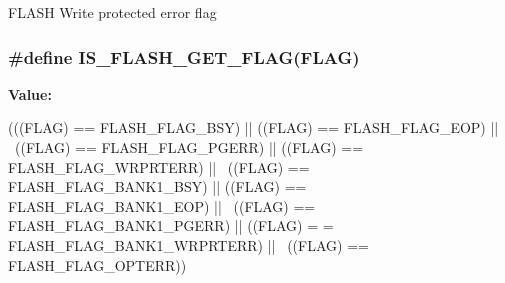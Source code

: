 \label{group__FLASH__Flags_ga5c59a7f07507cac38091275964d3d35d}
FLASH Write protected error flag \hypertarget{group__FLASH__Flags_ga61b60325cd94e1608e34afc7aff20ee4}{
\subsubsection[{IS\_\-FLASH\_\-GET\_\-FLAG}]{\setlength{\rightskip}{0pt plus 5cm}\#define IS\_\-FLASH\_\-GET\_\-FLAG(FLAG)}}
\label{group__FLASH__Flags_ga61b60325cd94e1608e34afc7aff20ee4}
{\bfseries Value:}
\begin{DoxyCode}
(((FLAG) == FLASH_FLAG_BSY) || ((FLAG) == FLASH_FLAG_EOP) || \
                                  ((FLAG) == FLASH_FLAG_PGERR) || ((FLAG) == 
      FLASH_FLAG_WRPRTERR) || \
                                                                  ((FLAG) == 
      FLASH_FLAG_BANK1_BSY) || ((FLAG) == FLASH_FLAG_BANK1_EOP) || \
                                  ((FLAG) == FLASH_FLAG_BANK1_PGERR) || ((FLAG) =
      = FLASH_FLAG_BANK1_WRPRTERR) || \
                                  ((FLAG) == FLASH_FLAG_OPTERR))
\end{DoxyCode}
